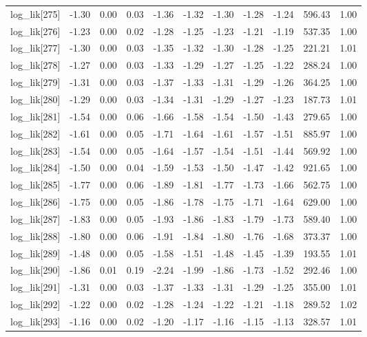 \begin{table}[ht]
\begin{tabular}{rrrrrrrrrrr}
  log\_lik[275] & -1.30 & 0.00 & 0.03 & -1.36 & -1.32 & -1.30 & -1.28 & -1.24 & 596.43 & 1.00 \\ 
  log\_lik[276] & -1.23 & 0.00 & 0.02 & -1.28 & -1.25 & -1.23 & -1.21 & -1.19 & 537.35 & 1.00 \\ 
  log\_lik[277] & -1.30 & 0.00 & 0.03 & -1.35 & -1.32 & -1.30 & -1.28 & -1.25 & 221.21 & 1.01 \\ 
  log\_lik[278] & -1.27 & 0.00 & 0.03 & -1.33 & -1.29 & -1.27 & -1.25 & -1.22 & 288.24 & 1.00 \\ 
  log\_lik[279] & -1.31 & 0.00 & 0.03 & -1.37 & -1.33 & -1.31 & -1.29 & -1.26 & 364.25 & 1.00 \\ 
  log\_lik[280] & -1.29 & 0.00 & 0.03 & -1.34 & -1.31 & -1.29 & -1.27 & -1.23 & 187.73 & 1.01 \\ 
  log\_lik[281] & -1.54 & 0.00 & 0.06 & -1.66 & -1.58 & -1.54 & -1.50 & -1.43 & 279.65 & 1.00 \\ 
  log\_lik[282] & -1.61 & 0.00 & 0.05 & -1.71 & -1.64 & -1.61 & -1.57 & -1.51 & 885.97 & 1.00 \\ 
  log\_lik[283] & -1.54 & 0.00 & 0.05 & -1.64 & -1.57 & -1.54 & -1.51 & -1.44 & 569.92 & 1.00 \\ 
  log\_lik[284] & -1.50 & 0.00 & 0.04 & -1.59 & -1.53 & -1.50 & -1.47 & -1.42 & 921.65 & 1.00 \\ 
  log\_lik[285] & -1.77 & 0.00 & 0.06 & -1.89 & -1.81 & -1.77 & -1.73 & -1.66 & 562.75 & 1.00 \\ 
  log\_lik[286] & -1.75 & 0.00 & 0.05 & -1.86 & -1.78 & -1.75 & -1.71 & -1.64 & 629.00 & 1.00 \\ 
  log\_lik[287] & -1.83 & 0.00 & 0.05 & -1.93 & -1.86 & -1.83 & -1.79 & -1.73 & 589.40 & 1.00 \\ 
  log\_lik[288] & -1.80 & 0.00 & 0.06 & -1.91 & -1.84 & -1.80 & -1.76 & -1.68 & 373.37 & 1.00 \\ 
  log\_lik[289] & -1.48 & 0.00 & 0.05 & -1.58 & -1.51 & -1.48 & -1.45 & -1.39 & 193.55 & 1.01 \\ 
  log\_lik[290] & -1.86 & 0.01 & 0.19 & -2.24 & -1.99 & -1.86 & -1.73 & -1.52 & 292.46 & 1.00 \\ 
  log\_lik[291] & -1.31 & 0.00 & 0.03 & -1.37 & -1.33 & -1.31 & -1.29 & -1.25 & 355.00 & 1.01 \\ 
  log\_lik[292] & -1.22 & 0.00 & 0.02 & -1.28 & -1.24 & -1.22 & -1.21 & -1.18 & 289.52 & 1.02 \\ 
  log\_lik[293] & -1.16 & 0.00 & 0.02 & -1.20 & -1.17 & -1.16 & -1.15 & -1.13 & 328.57 & 1.01 \\ 

\end{tabular}
\end{table}
